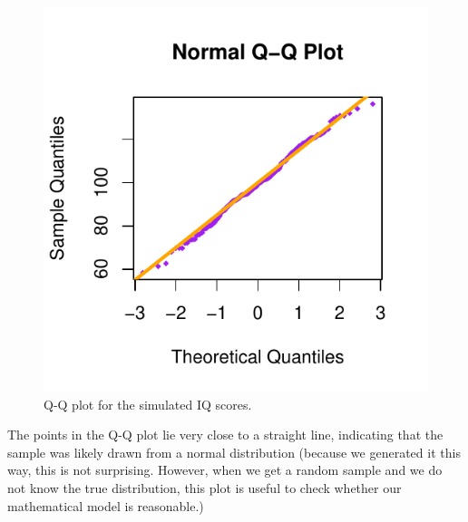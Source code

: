 \begin{knitrout}
\color{fgcolor}\begin{kframe}
\begin{alltt}
 \hlstd{=}\hlstd{,} \hlstd{=}\hlstd{,} \hlstd{=}\hlstd{)}
\hlstd{(}\hlstd{,}\hlstd{,}\hlstd{=}\hlstd{,} \hlstd{=}\hlstd{)}
\end{alltt}
\end{kframe}\begin{figure}

{\centering \includegraphics[width=\maxwidth]{figure/intro-lln1-1-1} 

}

\caption[Q-Q plot for the simulated IQ scores]{Q-Q plot for the simulated IQ scores.}\label{fig:intro-lln1-1}
\end{figure}

\end{knitrout}

The points in the Q-Q plot lie very close to a straight line, indicating that the sample  was  likely drawn from a normal distribution (because we generated it this way, this is not surprising. However, when we get a random sample and we do not know the true distribution, this plot is useful to check whether our mathematical model is reasonable.)

